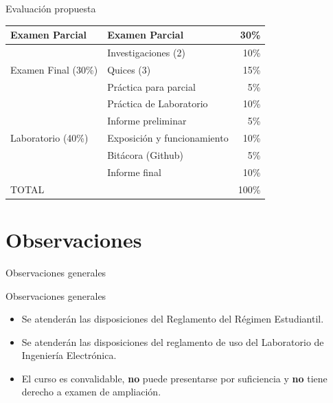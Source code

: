 \documentclass[xcolor=dvipsnames]{beamer}
\newcommand{\pageframe}[1]{\frame{\begin{center}{ \Huge #1 }\end{center}}}
\begin{document}
\begin{frame}{Evaluación propuesta}
\begin{center}
\begin{tabular}{|l|l|r|}\hline
	Examen Parcial		& Examen Parcial	& 	30\%\\\hline
				& Investigaciones (2)	&	10\%\\\cline{2-3}
	Examen Final (30\%)			& Quices (3)		&	15\%\\\cline{2-3}
				& Práctica para parcial &	 5\%\\\hline
				& Práctica de Laboratorio	&	 10\%\\\cline{2-3}
				& Informe preliminar	&	 5\%\\\cline{2-3}
	Laboratorio (40\%)			& Exposición y funcionamiento	&	10\%\\\cline{2-3}
				& Bitácora (Github)	&	 5\%\\\cline{2-3}
				& Informe final		&	10\%\\\hline\hline
	\multicolumn{2}{|l|}{TOTAL}			&	100\%\\\hline
\end{tabular}
\end{center}
\end{frame}
\section{Observaciones}

\pageframe{Observaciones}

\begin{frame}{Observaciones generales}
  \begin{block}{Observaciones generales}
    \begin{itemize}[<+->]
      \item Se atenderán las disposiciones del Reglamento del Régimen Estudiantil.
      \item Se atenderán las disposiciones del reglamento de uso del Laboratorio de Ingeniería Electrónica.
      \item El curso es convalidable, \textbf{no} puede presentarse por suficiencia y \textbf{no} tiene derecho a examen de ampliación.
    \end{itemize}
  \end{block}
\end{frame}
\end{document}
